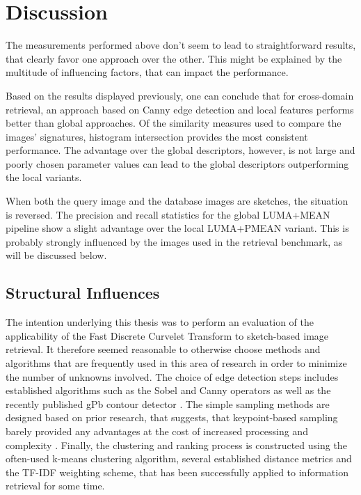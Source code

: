 \chapter{Discussion}\label{ch:discussion}

The measurements performed above don't seem to lead to straightforward results,
that clearly favor one approach over the other. This might be explained by the
multitude of influencing factors, that can impact the performance.

Based on the results displayed previously, one can conclude that for
cross-domain retrieval, an approach based on Canny edge detection and local
features performs better than global approaches. Of the similarity measures
used to compare the images' signatures, histogram intersection provides the
most consistent performance. 
The advantage over the global descriptors, however, is not large and poorly
chosen parameter values can lead to the global descriptors outperforming the
local variants.

When both the query image and the database images are sketches, the situation
is reversed. The precision and recall statistics for the global LUMA+MEAN
pipeline show a slight advantage over the local LUMA+PMEAN variant. This is
probably strongly influenced by the images used in the retrieval benchmark, as
will be discussed below.

\section{Structural Influences}

The intention underlying this thesis was to perform an evaluation of the
applicability of the Fast Discrete Curvelet Transform to sketch-based image
retrieval. It therefore seemed reasonable to otherwise choose methods and
algorithms that are frequently used in this area of research in order to
minimize the number of unknowns involved. The choice of edge detection steps
includes established algorithms such as the Sobel and Canny operators as well
as the recently published gPb contour detector
\autocite{arbelaez_contour_2011}. The simple sampling methods are designed
based on prior research, that suggests, that keypoint-based sampling barely
provided any advantages at the cost of increased processing and complexity
\autocite{nowak_sampling_2006}. Finally, the clustering and ranking process is
constructed using the often-used k-means clustering algorithm, several
established distance metrics and the TF-IDF weighting scheme, that has been
successfully applied to information retrieval for some time.

